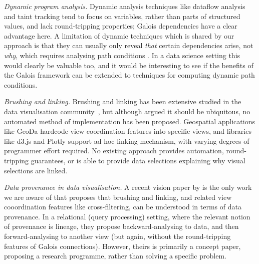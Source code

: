 \emph{Dynamic program analysis.} Dynamic analysis techniques like dataflow analysis \cite{chen88,reps95} and taint tracking \cite{reps95} tend to focus on variables, rather than parts of structured values, and lack round-tripping properties; Galois dependencies have a clear advantage here. A limitation of dynamic techniques which is shared by our approach is that they can usually only reveal \emph{that} certain dependencies arise, not \emph{why}, which requires analysing path conditions \cite{hammer06}. In a data science setting this would clearly be valuable too, and it would be interesting to see if the benefits of the Galois framework can be extended to techniques for computing dynamic path conditions.

\emph{Brushing and linking.} Brushing and linking has been extensive studied in the data visualisation community~\cite{mcdonald82,becker87}, but although \citet{roberts06} argued it should be ubiquitous, no automated method of implementation has been proposed. Geospatial applications like GeoDa \cite{anselin06} hardcode view coordination features into specific views, and libraries like d3.js and Plotly support ad hoc linking mechanism, with varying degrees of programmer effort required. No existing approach provides automation, round-tripping guarantees, or is able to provide data selections explaining why visual selections are linked.

\emph{Data provenance in data visualisation.} A recent vision paper by \citet{psallidas18} is the only work we are aware of that proposes that brushing and linking, and related view cooordination features like cross-filtering, can be understood in terms of data provenance. In a relational (query processing) setting, where the relevant notion of provenance is lineage, they propose backward-analysing to data, and then forward-analysing to another view (but again, without the round-tripping features of Galois connections). However, theirs is primarily a concept paper, proposing a research programme, rather than solving a specific problem.
